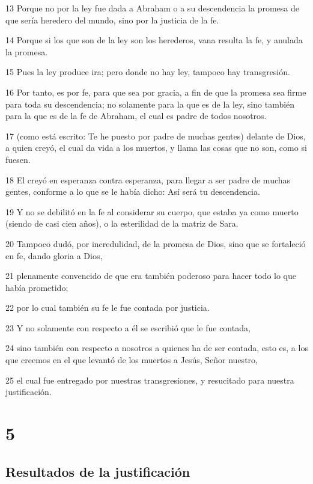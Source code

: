 \par 13 Porque no por la ley fue dada a Abraham o a su descendencia la promesa de que sería heredero del mundo, sino por la justicia de la fe.
\par 14 Porque si los que son de la ley son los herederos, vana resulta la fe, y anulada la promesa.
\par 15 Pues la ley produce ira; pero donde no hay ley, tampoco hay transgresión.
\par 16 Por tanto, es por fe, para que sea por gracia, a fin de que la promesa sea firme para toda su descendencia; no solamente para la que es de la ley, sino también para la que es de la fe de Abraham, el cual es padre de todos nosotros.
\par 17 (como está escrito: Te he puesto por padre de muchas gentes) delante de Dios, a quien creyó, el cual da vida a los muertos, y llama las cosas que no son, como si fuesen.
\par 18 El creyó en esperanza contra esperanza, para llegar a ser padre de muchas gentes, conforme a lo que se le había dicho: Así será tu descendencia.
\par 19 Y no se debilitó en la fe al considerar su cuerpo, que estaba ya como muerto (siendo de casi cien años), o la esterilidad de la matriz de Sara.
\par 20 Tampoco dudó, por incredulidad, de la promesa de Dios, sino que se fortaleció en fe, dando gloria a Dios,
\par 21 plenamente convencido de que era también poderoso para hacer todo lo que había prometido;
\par 22 por lo cual también su fe le fue contada por justicia.
\par 23 Y no solamente con respecto a él se escribió que le fue contada,
\par 24 sino también con respecto a nosotros a quienes ha de ser contada, esto es, a los que creemos en el que levantó de los muertos a Jesús, Señor nuestro,
\par 25 el cual fue entregado por nuestras transgresiones, y resucitado para nuestra justificación.

\chapter{5}

\section*{Resultados de la justificación}

